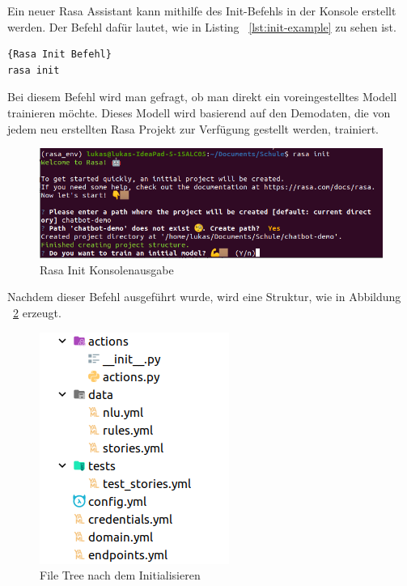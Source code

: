 Ein neuer Rasa Assistant kann mithilfe des Init-Befehls in der Konsole erstellt werden.
Der Befehl dafür lautet, wie in Listing ~\ref{lst:init-example} zu sehen ist.

\begin{lstlisting}[language=bash,label={lst:init-example},caption={Befehl fürs Initialisieren}]{Rasa Init Befehl}
rasa init
\end{lstlisting}

Bei diesem Befehl wird man gefragt, ob man direkt ein voreingestelltes Modell trainieren möchte.
Dieses Modell wird basierend auf den Demodaten, die von jedem neu erstellten Rasa Projekt zur Verfügung gestellt werden, trainiert.

\begin{figure}[hbt!]
    \centering
    \includegraphics[scale=0.5]{pics/rasa_init}
    \caption{Rasa Init Konsolenausgabe}
    \label{fig:rasa_init}
\end{figure}

Nachdem dieser Befehl ausgeführt wurde, wird eine Struktur, wie in Abbildung ~\ref{fig:file_tree} erzeugt.

\begin{figure}[hbt!]
    \centering
    \includegraphics[scale=0.75]{pics/rasa_file_tree}
    \caption{File Tree nach dem Initialisieren}
    \label{fig:file_tree}
\end{figure}


